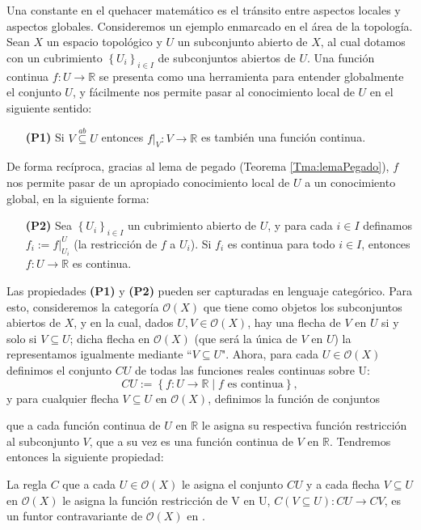 Una constante en el quehacer matemático es el tránsito entre aspectos locales y aspectos globales. Consideremos un ejemplo enmarcado en el área de la topología. Sean $X$ un espacio topológico y $U$ un subconjunto abierto de $X$, al cual dotamos con un cubrimiento $\left\lbrace U_i\right\rbrace_{i\in I}$ de subconjuntos abiertos de $U$. Una función continua $f:U\to \mathbb{R}$ se presenta como una herramienta para entender globalmente el conjunto $U$, y fácilmente nos permite pasar al conocimiento local de $U$ en el siguiente sentido:
\begin{itemize}
   \item[\textbf{(P1)}] Si $V\stackrel{ab}\subseteq U$ entonces $f|_V:V\to\mathbb{R}$ es también una función continua. 
\end{itemize}
De forma recíproca, gracias al lema de pegado (Teorema \ref{Tma:lemaPegado}), $f$ nos permite pasar de un apropiado conocimiento local de $U$ a un conocimiento global, en la siguiente forma:
\begin{itemize}
   \item[\textbf{(P2)}] Sea $\left\lbrace U_i\right\rbrace_{i\in I}$ un cubrimiento abierto de $U$, y para cada $i\in I$ definamos $f_i:=f|^{U}_{U_i}$ (la restricción de $f$ a $U_i$). Si $f_i$ es continua para todo $i\in I$, entonces $f:U\to\mathbb{R}$ es continua.
\end{itemize}
Las propiedades \textbf{(P1)} y \textbf{(P2)} pueden ser capturadas en lenguaje categórico. Para esto, consideremos la categoría $\mathcal{O}(X)$ que tiene como objetos los subconjuntos abiertos de $X$, y en la cual, dados $U,V\in \mathcal{O}(X)$, hay una flecha de $V$ en $U$ si y solo si $V\subseteq U$; dicha flecha en $\mathcal{O}(X)$ (que será la única de $V$ en $U$) la representamos igualmente mediante ``$V\subseteq U$". Ahora, para cada $U\in\mathcal{O}(X)$ definimos el conjunto $CU$ de todas las funciones reales continuas sobre U:
$$
CU:=\left\lbrace f:U\to\mathbb{R}\mid f \text{ es continua}\right\rbrace,
$$
y para cualquier flecha $V\subseteq U$ en $\mathcal{O}(X)$, definimos la función de conjuntos

que a cada función continua de $U$ en $\mathbb{R}$ le asigna su respectiva función restricción al subconjunto $V$, que a su vez es una función continua de $V$ en $\mathbb{R}$. Tendremos entonces la siguiente propiedad:
\begin{Prop}\label{Prop:P1}
   La regla $C$ que a cada $U\in\mathcal{O}(X)$ le asigna el conjunto $CU$ y a cada flecha $V\subseteq U$ en $\mathcal{O}(X)$ le asigna la función restricción de V en U, $C(V\subseteq U): CU\to CV$, es un funtor contravariante de $\mathcal{O}(X)$ en .
\end{Prop}
